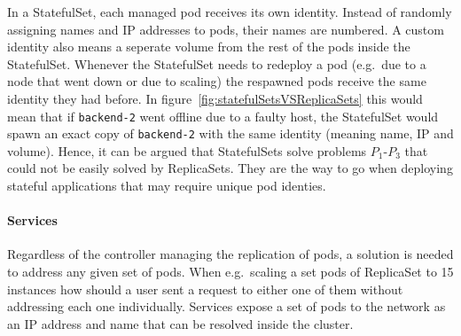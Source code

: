 In a StatefulSet, each managed pod receives its own identity. Instead of
randomly assigning names and \ac{IP} addresses to pods, their names are
numbered. A custom identity also means a seperate volume from the rest of the
pods inside the StatefulSet. Whenever the StatefulSet needs to redeploy a pod
(e.g.\ due to a node that went down or due to scaling) the respawned pods
receive the same identity they had before. In
figure~\ref{fig:statefulSetsVSReplicaSets} this would mean that if
\texttt{backend-2} went offline due to a faulty host, the StatefulSet would
spawn an exact copy of \texttt{backend-2} with the same identity (meaning name,
\ac{IP} and volume). Hence, it can be argued that StatefulSets solve problems
$P_1$-$P_3$ that could not be easily solved by ReplicaSets. They are the way to
go when deploying stateful applications that may require unique pod identies.

\paragraph{Services}%
\label{par:Services}
Regardless of the controller managing the replication of pods, a solution is
needed to address any given set of pods. When e.g.\ scaling a set pods of
ReplicaSet to 15 instances how should a user sent a request to either one of
them without addressing each one individually. Services expose a set of pods to
the network as an \ac{IP} address and name that can be resolved inside the
cluster.
